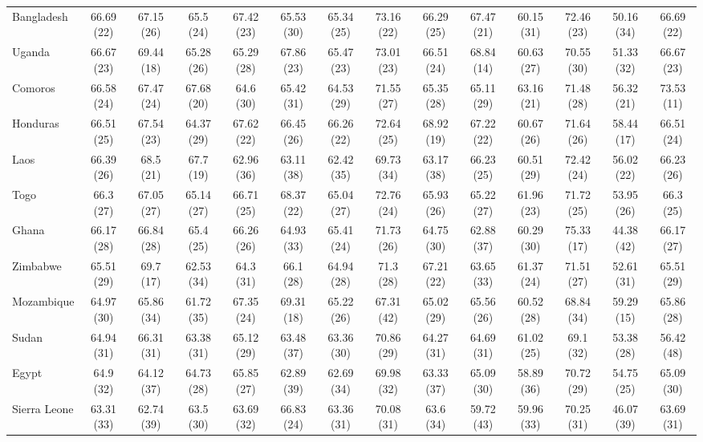 \begin{longtable}{lccccccccccccc}
Bangladesh & 66.69 (22) & 67.15 (26) & 65.5 (24) & 67.42 (23) & 65.53 (30) & 65.34 (25) & 73.16 (22) & 66.29 (25) & 67.47 (21) & 60.15 (31) & 72.46 (23) & 50.16 (34) & 66.69 (22) \\ 
Uganda & 66.67 (23) & 69.44 (18) & 65.28 (26) & 65.29 (28) & 67.86 (23) & 65.47 (23) & 73.01 (23) & 66.51 (24) & 68.84 (14) & 60.63 (27) & 70.55 (30) & 51.33 (32) & 66.67 (23) \\ 
Comoros & 66.58 (24) & 67.47 (24) & 67.68 (20) & 64.6 (30) & 65.42 (31) & 64.53 (29) & 71.55 (27) & 65.35 (28) & 65.11 (29) & 63.16 (21) & 71.48 (28) & 56.32 (21) & 73.53 (11) \\ 
Honduras & 66.51 (25) & 67.54 (23) & 64.37 (29) & 67.62 (22) & 66.45 (26) & 66.26 (22) & 72.64 (25) & 68.92 (19) & 67.22 (22) & 60.67 (26) & 71.64 (26) & 58.44 (17) & 66.51 (24) \\ 
Laos & 66.39 (26) & 68.5 (21) & 67.7 (19) & 62.96 (36) & 63.11 (38) & 62.42 (35) & 69.73 (34) & 63.17 (38) & 66.23 (25) & 60.51 (29) & 72.42 (24) & 56.02 (22) & 66.23 (26) \\ 
Togo & 66.3 (27) & 67.05 (27) & 65.14 (27) & 66.71 (25) & 68.37 (22) & 65.04 (27) & 72.76 (24) & 65.93 (26) & 65.22 (27) & 61.96 (23) & 71.72 (25) & 53.95 (26) & 66.3 (25) \\ 
Ghana & 66.17 (28) & 66.84 (28) & 65.4 (25) & 66.26 (26) & 64.93 (33) & 65.41 (24) & 71.73 (26) & 64.75 (30) & 62.88 (37) & 60.29 (30) & 75.33 (17) & 44.38 (42) & 66.17 (27) \\ 
Zimbabwe & 65.51 (29) & 69.7 (17) & 62.53 (34) & 64.3 (31) & 66.1 (28) & 64.94 (28) & 71.3 (28) & 67.21 (22) & 63.65 (33) & 61.37 (24) & 71.51 (27) & 52.61 (31) & 65.51 (29) \\ 
Mozambique & 64.97 (30) & 65.86 (34) & 61.72 (35) & 67.35 (24) & 69.31 (18) & 65.22 (26) & 67.31 (42) & 65.02 (29) & 65.56 (26) & 60.52 (28) & 68.84 (34) & 59.29 (15) & 65.86 (28) \\ 
Sudan & 64.94 (31) & 66.31 (31) & 63.38 (31) & 65.12 (29) & 63.48 (37) & 63.36 (30) & 70.86 (29) & 64.27 (31) & 64.69 (31) & 61.02 (25) & 69.1 (32) & 53.38 (28) & 56.42 (48) \\ 
Egypt & 64.9 (32) & 64.12 (37) & 64.73 (28) & 65.85 (27) & 62.89 (39) & 62.69 (34) & 69.98 (32) & 63.33 (37) & 65.09 (30) & 58.89 (36) & 70.72 (29) & 54.75 (25) & 65.09 (30) \\ 
Sierra Leone & 63.31 (33) & 62.74 (39) & 63.5 (30) & 63.69 (32) & 66.83 (24) & 63.36 (31) & 70.08 (31) & 63.6 (34) & 59.72 (43) & 59.96 (33) & 70.25 (31) & 46.07 (39) & 63.69 (31) \\ 

\end{longtable}
